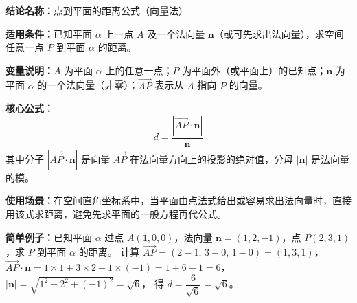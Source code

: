 \textbf{结论名称：}点到平面的距离公式（向量法）

\textbf{适用条件：}已知平面 \(\alpha\) 上一点 \(A\) 及一个法向量 \(\mathbf{n}\)（或可先求出法向量），求空间任意一点 \(P\) 到平面 \(\alpha\) 的距离。

\textbf{变量说明：}\(A\) 为平面 \(\alpha\) 上的任意一点；\(P\) 为平面外（或平面上）的已知点；\(\mathbf{n}\) 为平面 \(\alpha\) 的一个法向量（非零）；\(\vec{AP}\) 表示从 \(A\) 指向 \(P\) 的向量。

\textbf{核心公式：}
\[
\boxed{d = \frac{|\vec{AP} \cdot \mathbf{n}|}{|\mathbf{n}|}}
\]
其中分子 \(|\vec{AP} \cdot \mathbf{n}|\) 是向量 \(\vec{AP}\) 在法向量方向上的投影的绝对值，分母 \(|\mathbf{n}|\) 是法向量的模。

\textbf{使用场景：}在空间直角坐标系中，当平面由点法式给出或容易求出法向量时，直接用该式求距离，避免先求平面的一般方程再代公式。

\textbf{简单例子：}已知平面 \(\alpha\) 过点 \(A(1,0,0)\)，法向量 \(\mathbf{n} = (1,2,-1)\)，点 \(P(2,3,1)\)，求 \(P\) 到平面 \(\alpha\) 的距离。
计算 \(\vec{AP} = (2-1,\,3-0,\,1-0) = (1,3,1)\)，
\(\vec{AP} \cdot \mathbf{n} = 1\times 1 + 3\times 2 + 1\times(-1) = 1+6-1 = 6\)，
\(|\mathbf{n}| = \sqrt{1^2+2^2+(-1)^2} = \sqrt{6}\)，
得 \(d = \dfrac{6}{\sqrt{6}} = \sqrt{6}\)。